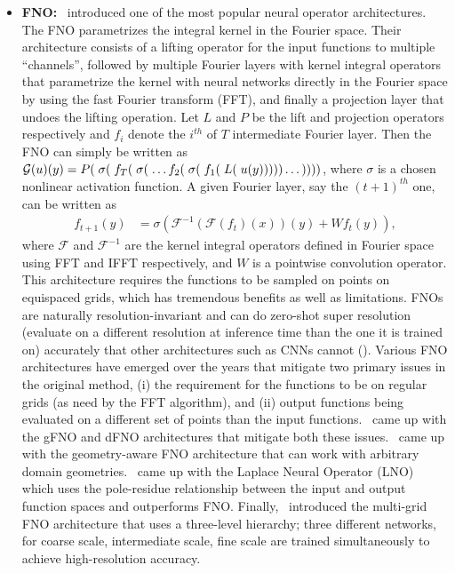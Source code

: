\begin{itemize}
\item {\bf FNO:}~\citep{li2020fourier} introduced one of the most popular neural operator architectures. The FNO parametrizes the integral kernel in the Fourier space. Their architecture consists of a lifting operator for the input functions to multiple ``channels'', followed by multiple Fourier layers with kernel integral operators that parametrize the kernel with neural networks directly in the Fourier space by using the fast Fourier transform (FFT), and finally a projection layer that undoes the lifting operation. Let $L$ and $P$ be the lift and projection operators respectively and $f_i$ denote the $i^{th}$ of $T$ intermediate Fourier layer. Then the FNO can simply be written as $\mathcal{G}(u)(y) = P(\; \sigma(\; f_T(\; \sigma(\; \dots f_2(\; \sigma(\; f_1(\; L(\; u(y))))) \dots ))))$, where $\sigma$ is a chosen nonlinear activation function. A given Fourier layer, say the $(t+1)^{th}$ one, can be written as
\begin{align}
f_{t+1}(y) &= \sigma\left(\mathcal{F}^{-1}\left( \mathcal{F}(f_t)(x) \right)(y) +  W f_t(y) \right),
\end{align}
where $\mathcal{F}$ and $\mathcal{F}^{-1}$ are the kernel integral operators defined in Fourier space using FFT and IFFT respectively, and $W$ is a pointwise convolution operator. This architecture requires the functions to be sampled on points on equispaced grids, which has tremendous benefits as well as limitations. FNOs are naturally resolution-invariant and can do zero-shot super resolution (evaluate on a different resolution at inference time than the one it is trained on) accurately that other architectures such as CNNs cannot (\citep[Section 4]{li2020fourier}). Various FNO architectures have emerged over the years that mitigate two primary issues in the original method, (i) the requirement for the functions to be on regular grids (as need by the FFT algorithm), and (ii) output functions being evaluated on a different set of points than the input functions.~\citep{lu2022comprehensive} came up with the gFNO and dFNO architectures that mitigate both these issues.~\citep{li2023fourier} came up with the geometry-aware FNO architecture that can work with arbitrary domain geometries.~\citep{cao2024laplace} came up with the Laplace Neural Operator (LNO) which uses the pole-residue relationship between the input and output function spaces and outperforms FNO. Finally,~\citep{guo2024mgfno} introduced the multi-grid FNO architecture that uses a three-level hierarchy; three different networks, for coarse scale, intermediate scale, fine scale are trained simultaneously to achieve high-resolution accuracy.


\end{itemize}
